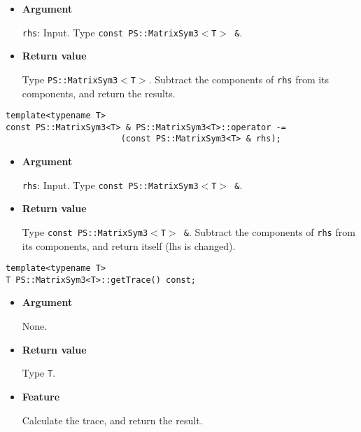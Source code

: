 \begin{itemize}

\item{{\bf Argument}}

\texttt{rhs}: Input. Type \texttt{const PS::MatrixSym3$<$T$>$ \&}.

\item{{\bf Return value}}

Type \texttt{PS::MatrixSym3$<$T$>$}. Subtract the components of \texttt{rhs} from its
components, and return the results.

\end{itemize}

\begin{screen}
\begin{verbatim}
template<typename T>
const PS::MatrixSym3<T> & PS::MatrixSym3<T>::operator -= 
                       (const PS::MatrixSym3<T> & rhs);
\end{verbatim}
\end{screen}

\begin{itemize}

\item{{\bf Argument}}

\texttt{rhs}: Input. Type \texttt{const PS::MatrixSym3$<$T$>$ \&}.

\item{{\bf Return value}}

Type \texttt{const PS::MatrixSym3$<$T$>$ \&}. Subtract the components of \texttt{rhs} from
its components, and return itself (lhs is changed).

\end{itemize}


\begin{screen}
\begin{verbatim}
template<typename T>
T PS::MatrixSym3<T>::getTrace() const;
\end{verbatim}
\end{screen}

\begin{itemize}

\item{{\bf Argument}}

  None.

\item{{\bf Return value}}

  Type \texttt{T}.

\item{{\bf Feature}}

  Calculate the trace, and return the result.

\end{itemize}

